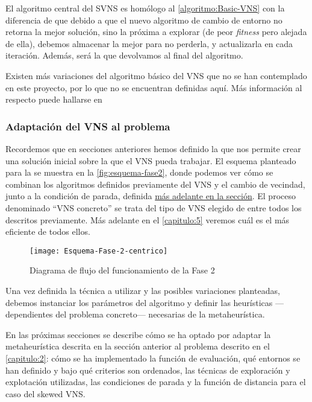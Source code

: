 El algoritmo central del SVNS es homólogo al \autoref{algoritmo:Basic-VNS} con la diferencia de que debido a que el nuevo algoritmo de cambio de entorno no retorna la mejor solución, sino la próxima a explorar (de peor \textit{fitness} pero alejada de ella), debemos almacenar la mejor para no perderla, y actualizarla en cada iteración. Además, será la que devolvamos al final del algoritmo.

Existen más variaciones del algoritmo básico del VNS que no se han contemplado en este proyecto, por lo que no se encuentran definidas aquí. Más información al respecto puede hallarse en~\cite{vns}

\subsubsection{Adaptación del VNS al problema}
\label{apartado:adaptacion-VNS}

Recordemos que en secciones anteriores hemos definido la \faseuno{} que nos permite crear una solución inicial sobre la que el VNS pueda trabajar. El esquema planteado para la \fasedos{} se muestra en la \autoref{fig:esquema-fase2}, donde podemos ver cómo se combinan los algoritmos definidos previamente del VNS y el cambio de vecindad, junto a la condición de parada, definida \hyperref[apartado:condiciones-parada]{más adelante en la sección}. El proceso denominado ``VNS concreto'' se trata del tipo de VNS elegido de entre todos los descritos previamente. Más adelante en el \autoref{capitulo:5} veremos cuál es el más eficiente de todos ellos.

\begin{figure}[htbp]
    \centering
    \texttt{[image: Esquema-Fase-2-centrico]}
    \caption{Diagrama de flujo del funcionamiento de la Fase 2}
    \label{fig:esquema-fase2}
\end{figure}

\vspace*{\fill}

Una vez definida la técnica a utilizar y las posibles variaciones planteadas, debemos instanciar los parámetros del algoritmo y definir las heurísticas ---dependientes del problema concreto--- necesarias de la metaheurística.

En las próximas secciones se describe cómo se ha optado por adaptar la metaheurística descrita en la sección anterior al problema descrito en el \autoref{capitulo:2}: cómo se ha implementado la función de evaluación, qué entornos se han definido y bajo qué criterios son ordenados, las técnicas de exploración y explotación utilizadas, las condiciones de parada y la función de distancia para el caso del skewed VNS.

